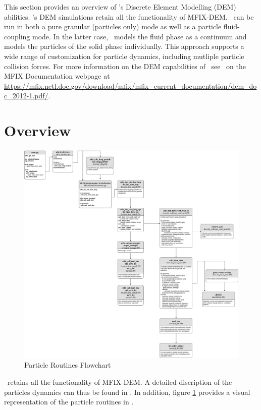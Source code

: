 This section provides an overview of \mfix's Discrete Element Modelling (DEM)
abilities. \mfix's DEM simulations retain all the functionality of MFIX-DEM.
\mfix\ can be run in both a pure granular (particles only) mode
as well as a particle fluid-coupling mode. In the latter case, \mfix\ models
the fluid phase as a continuum and models the
particles of the solid phase individually. This approach supports a wide range
of customization for particle dynamics, including mutliple particle collision
forces. For more information on the DEM capabilities of \mfix\
see \demdoc\ on the MFIX Documentation webpage at
{\url{https://mfix.netl.doe.gov/download/mfix/mfix_current_documentation/dem_doc_2012-1.pdf/}}.

\section{Overview}

\begin{figure}
    \includegraphics[width=\linewidth,natwidth=800, natheight=600]{./Particles/MFIX-Particle-Diagram.png}
    \caption{Particle Routines Flowchart}
    \label{fig:pflowchart}
\end{figure}

\mfix\ retains all the functionality of MFIX-DEM. A detailed discription of the
particles dynamics can thus be found in \demdoc.
In addition, figure \ref{fig:pflowchart} provides a visual representation
of the particle routines in \mfix.

